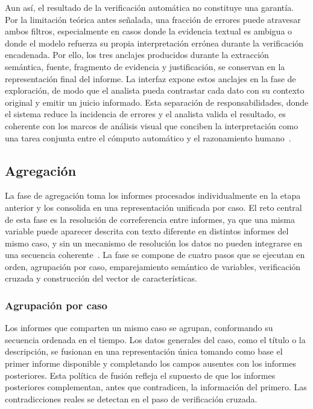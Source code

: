 Aun así, el resultado de la verificación automática no 
constituye una garantía. Por la limitación teórica antes 
señalada, una fracción de errores puede atravesar ambos 
filtros, especialmente en casos donde la evidencia textual es 
ambigua o donde el modelo refuerza su propia interpretación 
errónea durante la verificación encadenada. Por ello, los 
tres anclajes producidos durante la extracción semántica, 
fuente, fragmento de evidencia y justificación, se conservan 
en la representación final del informe. La interfaz expone 
estos anclajes en la fase de exploración, de modo que el 
analista pueda contrastar cada dato con su contexto original 
y emitir un juicio informado. Esta separación de 
responsabilidades, donde el sistema reduce la incidencia de 
errores y el analista valida el resultado, es coherente con 
los marcos de análisis visual que conciben la interpretación 
como una tarea conjunta entre el cómputo automático y el 
razonamiento humano~\cite{keim2008visual, sacha2014}.

\subsection{Agregación}

La fase de agregación toma los informes procesados 
individualmente en la etapa anterior y los consolida en una 
representación unificada por caso. El reto central de esta 
fase es la resolución de correferencia entre informes, ya que 
una misma variable puede aparecer descrita con texto diferente 
en distintos informes del mismo caso, y sin un mecanismo de 
resolución los datos no pueden integrarse en una secuencia 
coherente~\cite{cattan2021crossdoc}. La fase se compone de 
cuatro pasos que se ejecutan en orden, agrupación por caso, 
emparejamiento semántico de variables, verificación cruzada y 
construcción del vector de características.

\subsubsection{Agrupación por caso}

Los informes que comparten un mismo caso se agrupan, 
conformando su secuencia ordenada en el tiempo. Los datos 
generales del caso, como el título o la descripción, se fusionan 
en una representación única tomando como base el primer informe 
disponible y completando los campos ausentes con los informes 
posteriores. Esta política de fusión refleja el supuesto de que 
los informes posteriores complementan, antes que contradicen, 
la información del primero. Las contradicciones reales se 
detectan en el paso de verificación cruzada.

